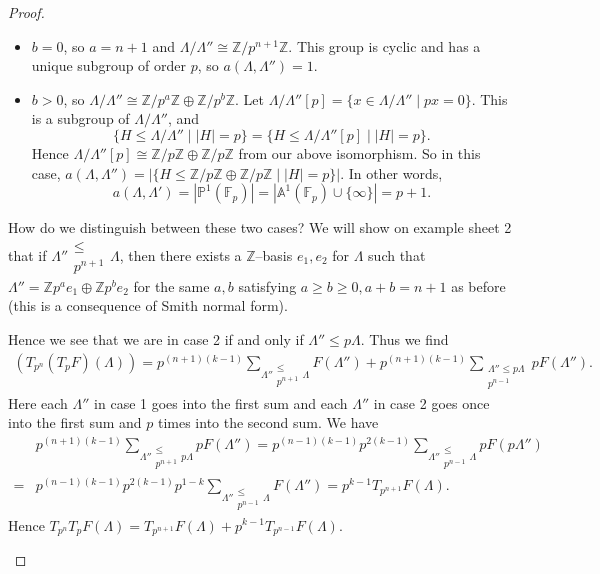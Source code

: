 \documentclass{article}
\theoremstyle{definition}
\begin{document}
\begin{proof}
\begin{enumerate}[(1)]
        \begin{itemize}
            \item $b = 0$, so $a = n+1$ and $\Lambda/\Lambda'' \cong \mathbb{Z}/p^{n+1}\mathbb{Z}$. This group is cyclic and has a unique subgroup of order $p$, so $a(\Lambda,\Lambda'') = 1$.
            \item $b>0$, so $\Lambda/\Lambda'' \cong \mathbb{Z}/p^a \mathbb{Z} \oplus \mathbb{Z}/p^b \mathbb{Z}$. Let $\Lambda/\Lambda''[p] = \{x \in \Lambda/\Lambda'' \mid px = 0\}$. This is a subgroup of $\Lambda/\Lambda''$, and \[
            \{H \le \Lambda/\Lambda'' \mid |H| = p\}  = \{H \le \Lambda/\Lambda''[p] \mid  |H| = p\}.
            \]
            Hence $\Lambda/\Lambda''[p] \cong \mathbb{Z}/p\mathbb{Z} \oplus \mathbb{Z}/p\mathbb{Z}$ from our above isomorphism. So in this case, $a(\Lambda,\Lambda'')  = |\{H \le \mathbb{Z}/p\mathbb{Z} \oplus \mathbb{Z}/p\mathbb{Z} \mid |H|= p\}|$. In other words, \[
            a(\Lambda,\Lambda') = |\mathbb{P}^1(\mathbb{F}_p)| = |\mathbb{A}^1(\mathbb{F}_p) \cup \{\infty\}| = p+1.
            \]
        \end{itemize} 
        How do we distinguish between these two cases? We will show on example sheet 2 that if $\Lambda'' \substack{\le \\ p^{n+1}}\Lambda$, then there exists a $\mathbb{Z}$--basis $e_1, e_2$ for $\Lambda$ such that $\Lambda'' = \mathbb{Z}p^a e_1 \oplus \mathbb{Z} p^b e_2$ for the same $a,b$ satisfying $a\ge b\ge 0, a+b = n+1$ as before (this is a consequence of Smith normal form).
        \vspace{1mm}
         
        Hence we see that we are in case 2 if and only if $\Lambda'' \le p \Lambda$. Thus we find
        \begin{align*}
            (T_{p^n}(T_pF)(\Lambda)) = p^{(n+1)(k-1)}\sum_{\Lambda'' \substack{\le \\ p^{n+1}}\Lambda} F(\Lambda'') + p^{(n+1)(k-1)} \sum_{\substack{ \Lambda''\le p \Lambda\\p^{n-1} } }^{} pF(\Lambda'').
        \end{align*}
        Here each $\Lambda''$ in case 1 goes into the first sum and each $\Lambda''$ in case 2 goes once into the first sum and $p$ times into the second sum. We have 
        \begin{align*}
            &p^{(n+1)(k-1)} \sum_{\Lambda'' \substack{\le \\p^{n+1}} p \Lambda} p F(\Lambda'') = p^{(n-1)(k-1)}p^{2(k-1)}\sum_{\Lambda'' \substack{\le \\ p^{n-1}}\Lambda} p F(p \Lambda'') \\
            =& p^{(n-1)(k-1)}p^{2(k-1)}p^{1-k}\sum_{\Lambda'' \substack{\le \\ p^{n-1}}\Lambda} F(\Lambda'') = p^{k-1}T_{p^{n+1}}F(\Lambda).
        \end{align*}
        Hence $T_{p^n}T_p F(\Lambda) = T_{p^{n+1}}F(\Lambda) + p^{k-1} T_{p^{n-1}}F(\Lambda)$.
    \end{enumerate}
\end{proof}
\end{document}
